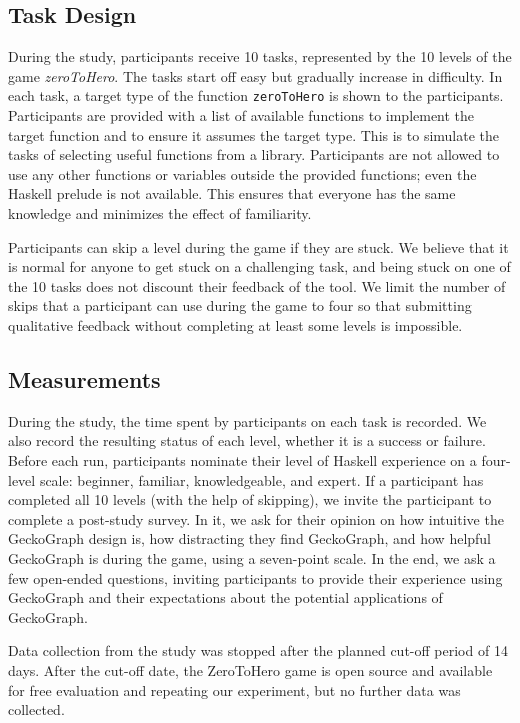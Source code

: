 \documentclass[preprint,12pt]{elsarticle}
\begin{document}
\subsection{Task Design} \label{subsection:task}
During the study, participants receive 10 tasks, represented by the 10 levels of the game {\it zeroToHero}. The tasks start off easy but gradually increase in difficulty.  In each task, a target type of the function \texttt{zeroToHero} is shown to the participants. Participants are provided with a list of available functions to implement the target function and to ensure it assumes the target type. This is to simulate the tasks of selecting useful functions from a library. Participants are not allowed to use any other functions or variables outside the provided functions; even the Haskell prelude is not available. This ensures that everyone has the same knowledge and minimizes the effect of familiarity. 

Participants can skip a level during the game if they are stuck. We believe that it is normal for anyone to get stuck on a challenging task, and being stuck on one of the 10 tasks does not discount their feedback of the tool. We limit the number of skips that a participant can use during the game to four so that submitting qualitative feedback without completing at least some levels is impossible. 

\subsection{Measurements}
During the study, the time spent by participants on each task is recorded. We also record the resulting status of each level, whether it is a success or failure. Before each run, participants nominate their level of Haskell experience on a four-level scale: beginner, familiar,  knowledgeable, and expert.  If a participant has completed all 10 levels (with the help of skipping), we invite the participant to complete a post-study survey. In it, we ask for their opinion on how intuitive the GeckoGraph design is, how distracting they find GeckoGraph, and how helpful GeckoGraph is during the game, using a seven-point scale. In the end, we ask a few open-ended questions, inviting participants to provide their experience using GeckoGraph and their expectations about the potential applications of GeckoGraph.

Data collection from the study was stopped after the planned cut-off period of 14 days. After the cut-off date, the ZeroToHero game is open source and available for free evaluation \cite{Anonymous_undated-ne} and repeating our experiment, but no further data was collected. 
\end{document}
